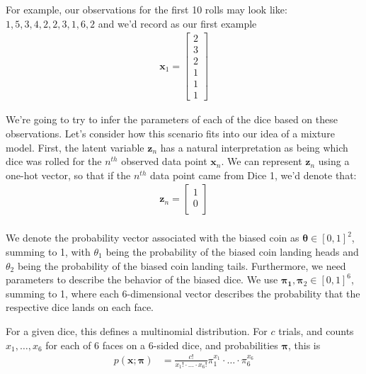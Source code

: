   For example, our observations for the first 10 rolls may look like: 
    $    1, 5, 3, 4, 2, 2, 3, 1, 6, 2$ and we'd record as our first example
\begin{align*}
    \textbf{x}_1 =
        \begin{bmatrix}
            2 \\
            3 \\
            2 \\
            1 \\
            1 \\
            1
        \end{bmatrix} 
\end{align*}


We're going to try to infer the parameters of each of the dice based on these observations.
%
Let's consider how this scenario fits into our idea of a mixture model. First, the latent variable $\textbf{z}_n$ has a natural interpretation as being which dice was rolled for the $n^{th}$ observed data point $\textbf{x}_n$. We can represent $\textbf{z}_n$ using a one-hot vector, so that if the $n^{th}$ data point came from Dice 1, we'd denote that:
\begin{align*}
    \textbf{z}_n =
        \begin{bmatrix}
            1 \\
            0 \\
        \end{bmatrix} \\
\end{align*}

We denote the probability vector associated with the biased coin as $\boldsymbol{\theta} \in [0,1]^{2}$, summing to 1, with $\theta_1$ being the probability of the biased coin landing heads and $\theta_2$ being the probability of the biased coin landing tails. Furthermore, we need parameters to describe the behavior of the biased dice. We use $\boldsymbol{\pi_1}, \boldsymbol{\pi}_2 \in [0,1]^{6}$, summing to 1, where each 6-dimensional vector describes the probability that the respective dice lands on each face.

For a given dice, this defines a multinomial distribution. For $c$ trials, and counts $x_1, \ldots, x_6$ for each of 6 faces on a 6-sided dice, and probabilities $\boldsymbol{\pi}$, this is
%
\begin{align}
  p(\mathbf{x}; \boldsymbol{\pi})&=\frac{c!}{x_1!\cdot \ldots \cdot x_6!}\pi_1^{x_1}\cdot \ldots \cdot \pi_6^{x_6}
\end{align}


